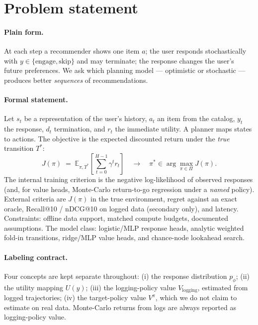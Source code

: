 \documentclass[11pt,a4paper]{article}
\newcommand{\J}{J(\pi)}
\newcommand{\E}{\mathbb{E}}
\begin{document}
\section{Problem statement}

\paragraph{Plain form.}
At each step a recommender shows one item $a$; the user responds stochastically with
$y \in \{\text{engage}, \text{skip}\}$ and may terminate; the response changes the
user's future preferences. We ask which planning model --- optimistic or stochastic ---
produces better \emph{sequences} of recommendations.

\paragraph{Formal statement.}
Let $s_t$ be a representation of the user's history, $a_t$ an item from the catalog,
$y_t$ the response, $d_t$ termination, and $r_t$ the immediate utility. A planner maps
states to actions. The objective is the expected discounted return under the \emph{true}
transition $T^{*}$:
\begin{equation}
  \J \;=\; \E_{\pi, T^{*}} \left[ \sum_{t=0}^{H-1} \gamma^{t} r_t \right]
  \quad\longrightarrow\quad
  \pi^{*} \in \arg\max_{\pi \in \Pi} \J .
\end{equation}
The internal training criterion is the negative log-likelihood of observed responses
(and, for value heads, Monte-Carlo return-to-go regression under a \emph{named} policy).
External criteria are $\J$ in the true environment, regret against an exact oracle,
Recall@10 / nDCG@10 on logged data (secondary only), and latency. Constraints: offline
data support, matched compute budgets, documented assumptions. The model class:
logistic/MLP response heads, analytic weighted fold-in transitions, ridge/MLP value
heads, and chance-node lookahead search.

\paragraph{Labeling contract.}
Four concepts are kept separate throughout: (i) the response distribution $p_\phi$;
(ii) the utility mapping $U(y)$; (iii) the logging-policy value $V_{\text{logging}}$,
estimated from logged trajectories; (iv) the target-policy value $V^{\pi}$, which we do
not claim to estimate on real data. Monte-Carlo returns from logs are always reported as
logging-policy value.
\end{document}
